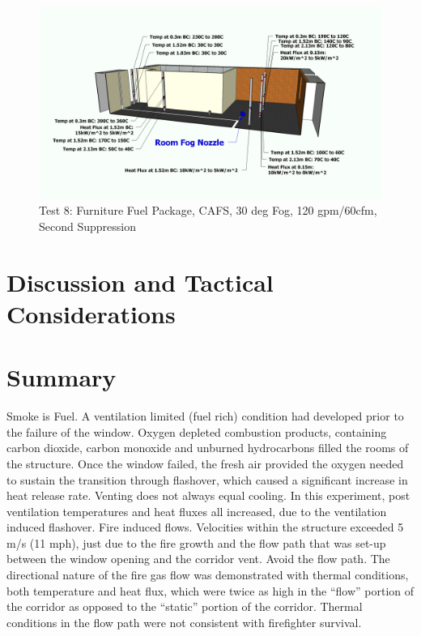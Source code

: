 \documentclass[12pt,oneside]{book}
\begin{document}
\begin{figure}[!ht]
	\includegraphics[width=6in]{../Figures/Pictures/Metric/DelCoFogTest8SecondSuppression}
	\caption{Test 8: Furniture Fuel Package, CAFS, 30 deg Fog, 120 gpm/60cfm, Second Suppression}
	\label{fig:Test_8_Second_Suppression}
\end{figure}

\clearpage

\chapter{Discussion and Tactical Considerations}
\label{chap:Discussion_and_Tactical_Considerations}

\chapter{Summary}
\label{chap:Summary}


Smoke is Fuel. A ventilation limited (fuel rich) condition had developed prior to the failure of
the window. Oxygen depleted combustion products, containing carbon dioxide, carbon monoxide and
unburned hydrocarbons filled the rooms of the structure. Once the window failed, the fresh air provided
the oxygen needed to sustain the transition through flashover, which caused a significant increase in heat
release rate.
Venting does not always equal cooling. In this experiment, post ventilation temperatures and
heat fluxes all increased, due to the ventilation induced flashover.
Fire induced flows. Velocities within the structure exceeded 5 m/s (11 mph), just due to the fire
growth and the flow path that was set-up between the window opening and the corridor vent.
Avoid the flow path. The directional nature of the fire gas flow was demonstrated with thermal
conditions, both temperature and heat flux, which were twice as high in the “flow” portion of the
corridor as opposed to the “static” portion of the corridor. Thermal conditions in the
flow path were not consistent with firefighter survival.
\end{document}
